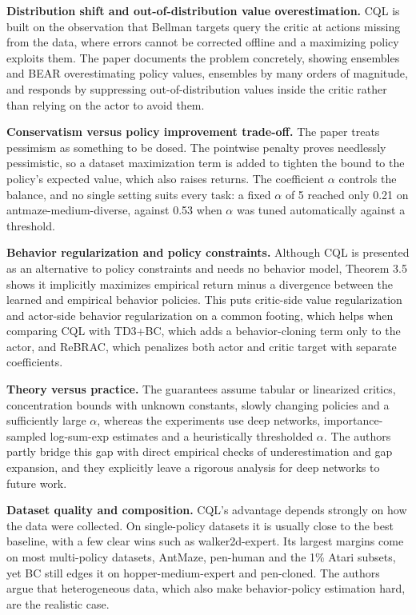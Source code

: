 \documentclass[11pt]{article}
\begin{document}
\textbf{Distribution shift and out-of-distribution value overestimation.} CQL is built on the observation that Bellman targets query the critic at actions missing from the data, where errors cannot be corrected offline and a maximizing policy exploits them. The paper documents the problem concretely, showing ensembles and BEAR overestimating policy values, ensembles by many orders of magnitude, and responds by suppressing out-of-distribution values inside the critic rather than relying on the actor to avoid them.

\textbf{Conservatism versus policy improvement trade-off.} The paper treats pessimism as something to be dosed. The pointwise penalty proves needlessly pessimistic, so a dataset maximization term is added to tighten the bound to the policy's expected value, which also raises returns. The coefficient \ensuremath{\alpha} controls the balance, and no single setting suits every task: a fixed \ensuremath{\alpha} of 5 reached only 0.21 on antmaze-medium-diverse, against 0.53 when \ensuremath{\alpha} was tuned automatically against a threshold.

\textbf{Behavior regularization and policy constraints.} Although CQL is presented as an alternative to policy constraints and needs no behavior model, Theorem 3.5 shows it implicitly maximizes empirical return minus a divergence between the learned and empirical behavior policies. This puts critic-side value regularization and actor-side behavior regularization on a common footing, which helps when comparing CQL with TD3+BC, which adds a behavior-cloning term only to the actor, and ReBRAC, which penalizes both actor and critic target with separate coefficients.

\textbf{Theory versus practice.} The guarantees assume tabular or linearized critics, concentration bounds with unknown constants, slowly changing policies and a sufficiently large \ensuremath{\alpha}, whereas the experiments use deep networks, importance-sampled log-sum-exp estimates and a heuristically thresholded \ensuremath{\alpha}. The authors partly bridge this gap with direct empirical checks of underestimation and gap expansion, and they explicitly leave a rigorous analysis for deep networks to future work.

\textbf{Dataset quality and composition.} CQL's advantage depends strongly on how the data were collected. On single-policy datasets it is usually close to the best baseline, with a few clear wins such as walker2d-expert. Its largest margins come on most multi-policy datasets, AntMaze, pen-human and the 1\% Atari subsets, yet BC still edges it on hopper-medium-expert and pen-cloned. The authors argue that heterogeneous data, which also make behavior-policy estimation hard, are the realistic case.
\end{document}
